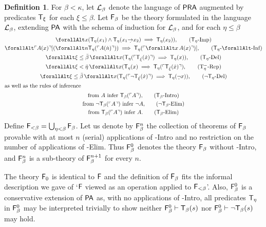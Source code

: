 \documentclass[UKenglish,cleveref,DIV=12]{scrartcl}
\let\forall\forallAlt
\theoremstyle{definition}
\newtheorem{definition}[lemma]{Definition}
\theoremstyle{definition}
\begin{document}
\begin{definition}%
For $\beta<\kappa$, let $\mathcal{L}_\beta$ denote the language of $\mathsf{PRA}$ augmented by
predicates  $\mathsf{T}_\xi$ for each $\xi\le\beta$. Let $\mathsf{F}_\beta$ be the theory
formulated in the language $\mathcal{L}_\beta$, extending $\mathsf{PA}$ with the schema of
induction for $\mathcal{L}_\beta$, and for each $\eta\le\beta$
\begin{gather}
  \forall x(\T_\eta(x_1)\land \T_\eta(x_1\dimplies x_2)\implies \T_\eta(x_2)),
	  \tag{\textT\eta-Imp}\label{exteqn:T-Imp}\\
  \forall\gn {A(x)}[(\forall n \T_\eta(\gn{A(\dot n)}))\implies
	\T_{\eta}(\gn{\forall x \,A(x)})],
	  \tag{\textT\eta-$\forall$-Inf}\label{exteqn:T-UInf}\\
  \forall \xi\le\bar\beta\,\forall x( \T_\eta(\gn{\T_{\dot{\xi}}(\dot
	x)})\implies \T_\eta(x)),
	  \tag{\textT\eta-Del}\label{exteqn:T-dag1}\\
  \forall \xi<\bar\eta \,\forall x(\T_\eta(x)\implies\T_\eta(\gn{
	  \T_{\dot{\xi}}(\dot x)}),
	  \tag{T$_\eta^-$-Rep}\label{exteqn:T-dag2}\\
  \forall \xi\le\bar\beta\,\forall x( \T_\eta(\gn{\lnot\T_{\dot{\xi}}(\dot x)})\implies \T_\eta(\dlnot x)),
	  \tag{$\lnot$\textT\eta-Del}\label{exteqn:T-dag3}\\
\intertext{as well as the rules of inference}
  \text{from $A$ infer $\T_\beta(\gn A)$,}\tag{\textT\beta-Intro}
	  \label{exteqn:T-Intro}\\
  \text{from $\lnot \T_\beta(\gn A)$ infer $\lnot A$,}
	  \tag{$\lnot$\textT\beta-Elim}\label{exteqn:notT-Elim}\\
  \text{from $\T_\beta(\gn A)$ infer $A$.}\tag{\textT\beta-Elim}
	  \label{exteqn:T-Elim}
\end{gather}
Define $\mathsf{F}_{<\beta}=\bigcup_{\eta<\beta}\mathsf{F}_\beta$. Let us denote by $\mathsf{F}_\beta^n$
the collection of theorems of $\mathsf{F}_\beta$ provable with at most $n$ (serial) applications
of \textT\beta-Intro and no restriction on the number of applications of
\textT\beta-Elim. Thus $\mathsf{F}_\beta^0$ denotes the theory $\mathsf{F}_\beta$ without
\textT\beta-Intro, and
$\mathsf{F}_\beta^n$ is a sub-theory of $\mathsf{F}_\beta^{n+1}$ for every $n$.
\end{definition}
The theory $\mathsf{F}_0$ is identical to $\mathsf{F}$ and the definition of $\mathsf{F}_{\beta}$ fits
the informal description we gave of `$\mathsf{F}$ viewed as an operation applied to
$\mathsf{F}_{<\beta}$'. Also, $\mathsf{F}_\beta^0$ is a conservative extension of
$\mathsf{PA}$ as, with no applications of \textT\beta-Intro, all predicates $\mathsf{T}_\eta$ in
$\mathsf{F}_\beta^0$ may be interpreted trivially to show neither $\mathsf{F}_\beta^0\vdash
\mathsf{T}_\beta(s)$ nor $\mathsf{F}_\beta^0\vdash \lnot \mathsf{T}_\beta(s)$ may hold.
\end{document}
